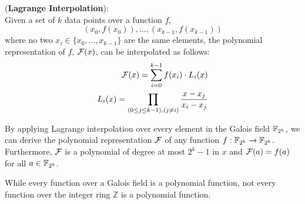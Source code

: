 \begin{Theorem} ({\bf Lagrange Interpolation}): \\
Given a set of $k$ data points over a function $f$,
\begin{equation}
(x_0,f(x_0)),\dots,(x_{k-1},f(x_{k-1})) \nonumber
\end{equation}
where no two $x_i \in \{x_0,\dots,x_{k-1}\}$ are the same elements,
the polynomial representation of $f$, ${\mathcal{F}}(x)$, can be interpolated as 
follows:  
\begin{eqnarray}
{\mathcal{F}}(x) = \sum_{i=0}^{k-1} f(x_i)\cdot L_i(x) \nonumber \\
L_i(x) =  \prod_{(0\leq j \leq k-1),(j\neq i)}\frac{x-x_j}{x_i-x_j} \nonumber  
\end{eqnarray}
\end{Theorem}

By applying Lagrange interpolation over every element in the Galois
field ${\mathbb{F}}_{2^k}$, 
we can derive the polynomial representation ${\mathcal{F}}$ of any function 
$f:{\mathbb{F}}_{2^k} \rightarrow {\mathbb{F}}_{2^k}$. Furthermore, ${\mathcal{F}}$ is a polynomial of degree 
at most $2^k-1$ in $x$ and ${\mathcal{F}}(a)=f(a)$ for all $a \in {\mathbb{F}}_{2^k}$.

While every function over a Galois field is a polynomial function,
not every function over the integer ring $\mathbb{Z}$ is a polynomial 
function.







